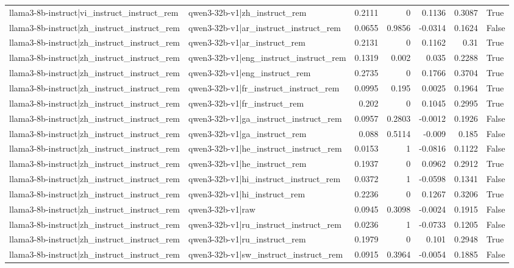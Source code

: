 \begin{table}
\begin{tabular}{l l r r r r l}
llama3-8b-instruct|vi_instruct_instruct_rem & qwen3-32b-v1|zh_instruct_rem & 0.2111 & 0 & 0.1136 & 0.3087 & True \\
llama3-8b-instruct|zh_instruct_instruct_rem & qwen3-32b-v1|ar_instruct_instruct_rem & 0.0655 & 0.9856 & -0.0314 & 0.1624 & False \\
llama3-8b-instruct|zh_instruct_instruct_rem & qwen3-32b-v1|ar_instruct_rem & 0.2131 & 0 & 0.1162 & 0.31 & True \\
llama3-8b-instruct|zh_instruct_instruct_rem & qwen3-32b-v1|eng_instruct_instruct_rem & 0.1319 & 0.002 & 0.035 & 0.2288 & True \\
llama3-8b-instruct|zh_instruct_instruct_rem & qwen3-32b-v1|eng_instruct_rem & 0.2735 & 0 & 0.1766 & 0.3704 & True \\
llama3-8b-instruct|zh_instruct_instruct_rem & qwen3-32b-v1|fr_instruct_instruct_rem & 0.0995 & 0.195 & 0.0025 & 0.1964 & True \\
llama3-8b-instruct|zh_instruct_instruct_rem & qwen3-32b-v1|fr_instruct_rem & 0.202 & 0 & 0.1045 & 0.2995 & True \\
llama3-8b-instruct|zh_instruct_instruct_rem & qwen3-32b-v1|ga_instruct_instruct_rem & 0.0957 & 0.2803 & -0.0012 & 0.1926 & False \\
llama3-8b-instruct|zh_instruct_instruct_rem & qwen3-32b-v1|ga_instruct_rem & 0.088 & 0.5114 & -0.009 & 0.185 & False \\
llama3-8b-instruct|zh_instruct_instruct_rem & qwen3-32b-v1|he_instruct_instruct_rem & 0.0153 & 1 & -0.0816 & 0.1122 & False \\
llama3-8b-instruct|zh_instruct_instruct_rem & qwen3-32b-v1|he_instruct_rem & 0.1937 & 0 & 0.0962 & 0.2912 & True \\
llama3-8b-instruct|zh_instruct_instruct_rem & qwen3-32b-v1|hi_instruct_instruct_rem & 0.0372 & 1 & -0.0598 & 0.1341 & False \\
llama3-8b-instruct|zh_instruct_instruct_rem & qwen3-32b-v1|hi_instruct_rem & 0.2236 & 0 & 0.1267 & 0.3206 & True \\
llama3-8b-instruct|zh_instruct_instruct_rem & qwen3-32b-v1|raw & 0.0945 & 0.3098 & -0.0024 & 0.1915 & False \\
llama3-8b-instruct|zh_instruct_instruct_rem & qwen3-32b-v1|ru_instruct_instruct_rem & 0.0236 & 1 & -0.0733 & 0.1205 & False \\
llama3-8b-instruct|zh_instruct_instruct_rem & qwen3-32b-v1|ru_instruct_rem & 0.1979 & 0 & 0.101 & 0.2948 & True \\
llama3-8b-instruct|zh_instruct_instruct_rem & qwen3-32b-v1|sw_instruct_instruct_rem & 0.0915 & 0.3964 & -0.0054 & 0.1885 & False \\

\end{tabular}
\end{table}

